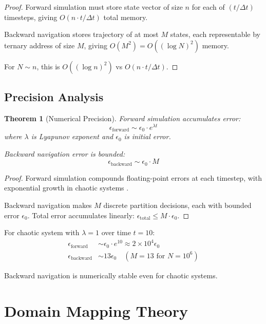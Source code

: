 \documentclass[twocolumn,10pt]{article}
\newtheorem{theorem}{Theorem}
\begin{document}
\begin{proof}
Forward simulation must store state vector of size $n$ for each of $(t/\Delta t)$ timesteps, giving $O(n \cdot t/\Delta t)$ total memory.

Backward navigation stores trajectory of at most $M$ states, each representable by ternary address of size $M$, giving $O(M^2) = O((\log N)^2)$ memory.

For $N \sim n$, this is $O((\log n)^2)$ vs $O(n \cdot t/\Delta t)$.
\end{proof}

\subsection{Precision Analysis}

\begin{theorem}[Numerical Precision]
Forward simulation accumulates error:
\begin{equation}
\epsilon_{\text{forward}} \sim \epsilon_0 \cdot e^{\lambda t}
\end{equation}
where $\lambda$ is Lyapunov exponent and $\epsilon_0$ is initial error.

Backward navigation error is bounded:
\begin{equation}
\epsilon_{\text{backward}} \sim \epsilon_0 \cdot M
\end{equation}
\end{theorem}

\begin{proof}
Forward simulation compounds floating-point errors at each timestep, with exponential growth in chaotic systems \cite{Tao2021}.

Backward navigation makes $M$ discrete partition decisions, each with bounded error $\epsilon_0$. Total error accumulates linearly: $\epsilon_{\text{total}} \leq M \cdot \epsilon_0$.
\end{proof}

For chaotic system with $\lambda = 1$ over time $t = 10$:
\begin{align}
\epsilon_{\text{forward}} &\sim \epsilon_0 \cdot e^{10} \approx 2 \times 10^4 \epsilon_0 \\
\epsilon_{\text{backward}} &\sim 13 \epsilon_0 \quad (M = 13 \text{ for } N = 10^6)
\end{align}

Backward navigation is numerically stable even for chaotic systems.

\section{Domain Mapping Theory}
\end{document}
